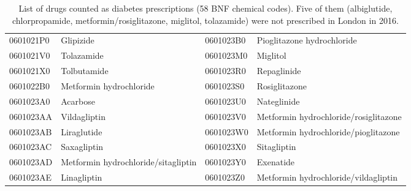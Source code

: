 \begin{table}[t!]
{\begin{tabular}{|l|l|l|l|}
            0601021P0 & Glipizide & 0601023B0 & Pioglitazone hydrochloride \\
            0601021V0 & Tolazamide & 0601023M0 & Miglitol \\
            0601021X0 & Tolbutamide & 0601023R0 & Repaglinide \\
            0601022B0 & Metformin hydrochloride & 0601023S0 & Rosiglitazone \\
            0601023A0 & Acarbose & 0601023U0 & Nateglinide \\
            0601023AA & Vildagliptin & 0601023V0 & Metformin hydrochloride/rosiglitazone \\
            0601023AB & Liraglutide & 0601023W0 & Metformin hydrochloride/pioglitazone \\
            0601023AC & Saxagliptin & 0601023X0 & Sitagliptin \\
            0601023AD & Metformin hydrochloride/sitagliptin & 0601023Y0 & Exenatide \\
            0601023AE & Linagliptin & 0601023Z0 & Metformin hydrochloride/vildagliptin \\
            \hline
    \end{tabular}}
    \caption{List of drugs counted as diabetes prescriptions (58 BNF chemical codes). Five of them (albiglutide, chlorpropamide, metformin/rosiglitazone, miglitol, tolazamide) were not prescribed in London in 2016.}
    \label{tab:diabetesdrugs}
\end{table}
